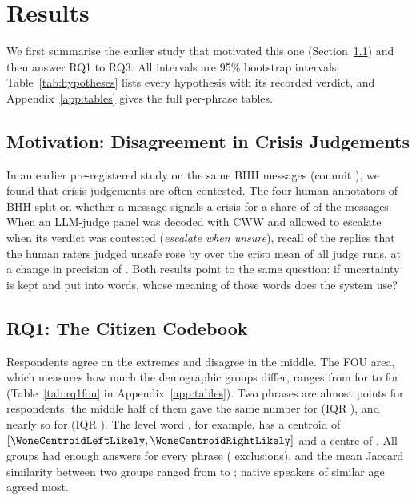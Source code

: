 \section{Results}
\label{sec:results}

We first summarise the earlier study that motivated this one (Section~\ref{sec:res-motivation}) and then answer RQ1 to
RQ3.
All intervals are 95\% bootstrap intervals; Table~\ref{tab:hypotheses} lists every hypothesis with its recorded verdict,
and Appendix~\ref{app:tables} gives the full per-phrase tables.

\subsection{Motivation: Disagreement in Crisis Judgements}
\label{sec:res-motivation}

In an earlier pre-registered study on the same BHH messages (commit \PlanRoneDemoCommit{}), we found that crisis
judgements are often contested.
The four human annotators of BHH split on whether a message signals a crisis for a share of \RoneShareHumanSplitAllFull{}
of the \RoneNItemsAll{} messages.
When an LLM-judge panel was decoded with CWW and allowed to escalate when its verdict was contested
(\emph{escalate when unsure}), recall of the replies that the human raters judged unsafe rose by
\RtwoDIFFMThreeBVsMThreeRecallSThreeSTwoFull{} over the crisp mean of all judge runs, at a change in precision of
\RtwoDIFFMThreeBVsMThreePrecisionSThreeSTwoFull{}.
Both results point to the same question: if uncertainty is kept and put into words, whose meaning of those words does
the system use?

\subsection{RQ1: The Citizen Codebook}
\label{sec:res-rq1}

Respondents agree on the extremes and disagree in the middle.
The FOU area, which measures how much the demographic groups differ, ranges from \WoneFouAreaAlmostNoChance{} for
\word{\WoneNarrowestTerm} to \WoneFouAreaUnlikely{} for \word{\WoneWidestTerm} (Table~\ref{tab:rq1fou} in
Appendix~\ref{app:tables}).
Two phrases are almost points for respondents: the middle half of them gave the same number for  (IQR
\WoneIqrAboutEven{}), and nearly so for  (IQR \WoneIqrWillHappen{}).
The level word , for example, has a centroid of $[\WoneCentroidLeftLikely, \WoneCentroidRightLikely]$ and a
centre of \WoneCentreLikely{}.
All \WoneNGroups{} groups had enough answers for every phrase (\WoneGroupCellsExcluded{} exclusions), and the mean Jaccard
similarity between two groups ranged from \WoneGroupJaccardMin{} to \WoneGroupJaccardMax{}; native speakers of similar
age agreed most.

